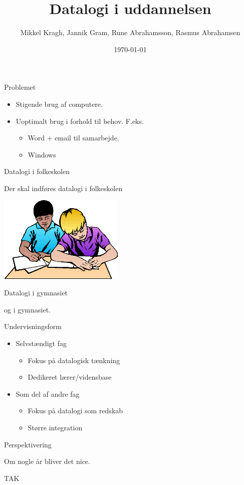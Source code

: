 \documentclass{beamer}
\title[Datalogi i uddannelsen]{Datalogi i uddannelsen}
\author{Mikkel Kragh, Jannik Gram, Rune Abrahamsson, Rasmus Abrahamsen}
\institute{DIKU}
\date{\today}
\begin{document}
\begin{frame}
\titlepage
\end{frame}


\begin{frame}{Problemet}
\begin{itemize}
\item Stigende brug af computere.
\item Uoptimalt brug i forhold til behov. F.eks.
\begin{itemize}
\item Word + email til samarbejde.
\item Windows
\end{itemize}
\end{itemize}

\end{frame}

\begin{frame}{Datalogi i folkeskolen}

Der skal indføres datalogi i folkeskolen

\includegraphics[width=60mm]{skole.png}

\end{frame}

\begin{frame}{Datalogi i gymnasiet}

og i gymnasiet.

\end{frame}

\begin{frame}{Undervisningsform}
\begin{itemize}
\item Selvstændigt fag
\begin{itemize}
\item Fokus på datalogisk tænkning
\item Dedikeret lærer/vidensbase
\end{itemize}
\item Som del af andre fag
\begin{itemize}
\item Fokus på datalogi som redskab
\item Større integration
\end{itemize}
\end{itemize}
\end{frame}

\begin{frame}{Perspektivering}

Om nogle år bliver det nice.

\end{frame}

\begin{frame}{TAK}

\end{frame}
\end{document}
